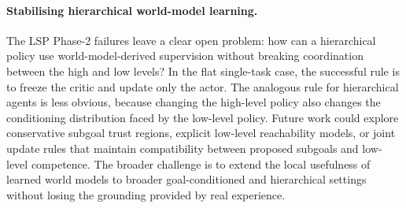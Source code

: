 \paragraph{Stabilising hierarchical world-model learning.}
The LSP Phase-2 failures leave a clear open problem: how can a
hierarchical policy use world-model-derived supervision without breaking
coordination between the high and low levels? In the flat single-task
case, the successful rule is to freeze the critic and update only the
actor. The analogous rule for hierarchical agents is less obvious,
because changing the high-level policy also changes the conditioning
distribution faced by the low-level policy. Future work could explore
conservative subgoal trust regions, explicit low-level reachability
models, or joint update rules that maintain compatibility between
proposed subgoals and low-level competence. The broader challenge is to extend the local usefulness of learned
world models to broader goal-conditioned and hierarchical settings
without losing the grounding provided by real experience.


